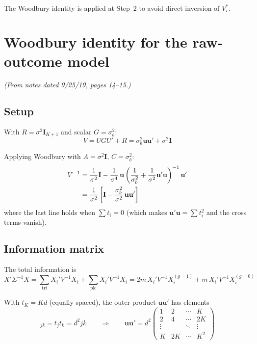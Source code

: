 \documentclass[11pt]{article}
\newcommand{\bI}{\mathbf{I}}
\newcommand{\bu}{\mathbf{u}}
\begin{document}
The Woodbury identity is applied at Step~2 to avoid
direct inversion of $V_i^*$.


\section{Woodbury identity for the raw-outcome model}
\label{sec:woodbury_raw}

\noindent
\textit{(From notes dated 9/25/19, pages 14--15.)}

\subsection{Setup}

With $R = \sigma^2 \bI_{K+1}$ and scalar $G = \sigma_b^2$:
\begin{equation}
  V = UGU' + R = \sigma_b^2 \bu\bu' + \sigma^2 \bI
\end{equation}

Applying Woodbury with $A = \sigma^2 \bI$,
$C = \sigma_b^2$:
\begin{align}
  V^{-1} &= \frac{1}{\sigma^2}\bI
    - \frac{1}{\sigma^4}\,\bu
    \left(\frac{1}{\sigma_b^2}
      + \frac{1}{\sigma^2}\bu'\bu\right)^{-1}
    \bu' \notag \\
  &= \frac{1}{\sigma^2}\left[
    \bI - \frac{\sigma_b^2}{\sigma^2}\,\bu\bu'
  \right]
  \label{eq:Vinv_raw}
\end{align}
where the last line holds when $\sum t_i = 0$ (which
makes $\bu'\bu = \sum t_i^2$ and the cross terms vanish).


\subsection{Information matrix}

The total information is
\begin{equation}
  X'\Sigma^{-1}X = \sum_{\text{trt}} X_i' V^{-1} X_i
    + \sum_{\text{plc}} X_i' V^{-1} X_i
  = 2m\, X_i' V^{-1} X_i^{(g=1)}
    + m\, X_i' V^{-1} X_i^{(g=0)}
\end{equation}

With $t_K = Kd$ (equally spaced), the outer product
$\bu\bu'$ has elements
\begin{equation}
  [\bu\bu']_{jk} = t_j t_k = d^2 jk
  \qquad\Longrightarrow\qquad
  \bu\bu' = d^2 \begin{pmatrix}
    1 & 2 & \cdots & K \\
    2 & 4 & \cdots & 2K \\
    \vdots & & \ddots & \vdots \\
    K & 2K & \cdots & K^2
  \end{pmatrix}
\end{equation}
\end{document}

